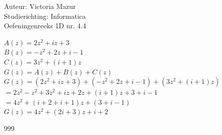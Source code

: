 \documentclass[a4paper]{article}
\begin{document}
  
\noindent \large Auteur: Victoria Mazur \\
\noindent \large Studierichting: Informatica\\
\noindent \large Oefeningenreeks 1D nr. 4.4\\

\medskip

\normalsize

$A(z) = 2z^2 + iz + 3$ \\

$B(z) = -z^2 + 2z + i - 1$ \\

$C(z) = 3z^2 + (i + 1)z$ \\

$G(z) = A(z) + B(z) + C(z)$ \\

$G(z) = (2z^2 + iz + 3) + (-z^2 + 2z + i - 1) + (3z^2 + (i + 1)z)$ \\

$= 2z^2 - z^2 + 3z^2 + iz + 2z + (i + 1)z + 3 + i - 1$ \\

$= 4z^2 + (i + 2 + i + 1)z + (3 + i - 1)$ \\

$G(z) = 4z^2 + (2i + 3)z + i + 2$ \\

\begin{thebibliography}{999}
\end{thebibliography}
\end{document}
